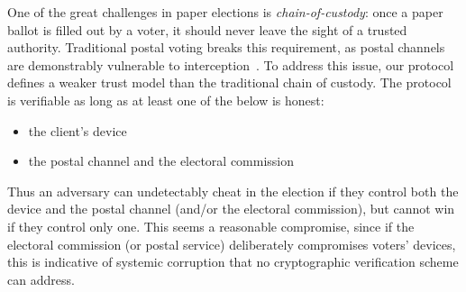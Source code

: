 \documentclass[12pt,a4paper]{article}
\theoremstyle{definition}
\begin{document}
One of the great challenges in paper elections is \textit{chain-of-custody}: once a paper ballot is filled out by a voter, it should never leave the sight of a trusted authority. Traditional postal voting breaks this requirement, as postal channels are demonstrably vulnerable to interception~\cite{stewart2010losing}. To address this issue, our protocol defines a weaker trust model than the traditional chain of custody. The protocol is verifiable as long as at least one of the below is honest:
\begin{itemize}
    \item the client's device
    \item the postal channel and the electoral commission
\end{itemize}
Thus an adversary can undetectably cheat in the election if they control both the device and the postal channel (and/or the electoral commission), but cannot win if they control only one. This seems a reasonable compromise, since if the electoral commission (or postal service) deliberately compromises voters' devices, this is indicative of systemic corruption that no cryptographic verification scheme can address.
\end{document}
